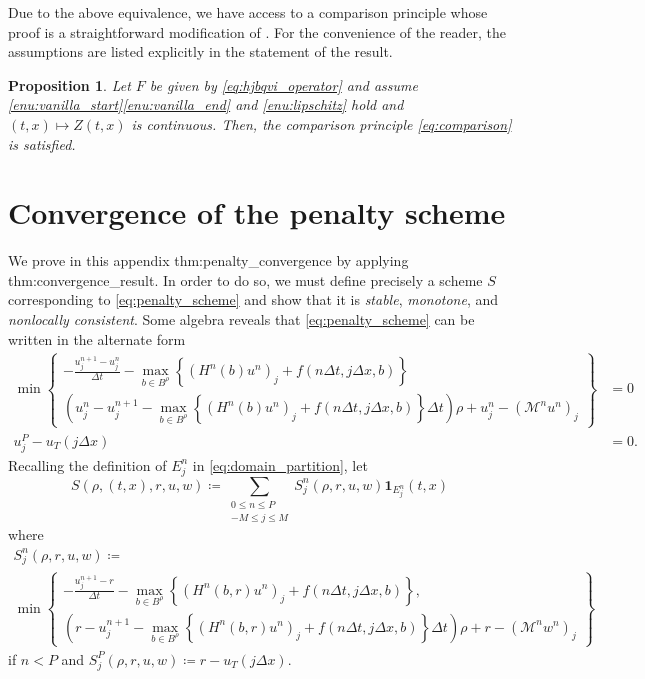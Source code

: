\documentclass[12pt]{article}
\newcounter{dummy}
\newtheorem{proposition}[dummy]{Proposition}
\begin{document}
Due to the above equivalence, we have access to a comparison principle
whose proof is a straightforward modification of \cite[Theorem 2.13]{azimzadeh2016value}.
For the convenience of the reader, the assumptions are listed explicitly
in the statement of the result.
\begin{proposition}
Let $F$ be given by \eqref{eq:hjbqvi_operator} and assume
\ref{enu:vanilla_start}\textendash \ref{enu:vanilla_end} and
\ref{enu:lipschitz} hold and $(t,x)\mapsto Z(t,x)$ is continuous.
Then, the comparison principle \eqref{eq:comparison} is satisfied.
\end{proposition}

\section{\label{app:penalty_convergence}Convergence of the penalty scheme}

We prove in this appendix {\prettyref}{thm:penalty_convergence} by
applying {\prettyref}{thm:convergence_result}. In order to do so, we
must define precisely a scheme $S$ corresponding to \eqref{eq:penalty_scheme}
and show that it is \emph{stable}, \emph{monotone}, and \emph{nonlocally
consistent}. Some algebra reveals that \eqref{eq:penalty_scheme}
can be written in the alternate form
\begin{align*}
\min\left\{ \begin{gathered}-\frac{u_{j}^{n+1}-u_{j}^{n}}{\Delta t}-\max_{b\in B^{\rho}}\left\{ (H^{n}(b)u^{n})_{j}+f(n\Delta t,j\Delta x,b)\right\} \\
(u_{j}^{n}{-}u_{j}^{n+1}-\max_{b\in B^{\rho}}\left\{ (H^{n}(b)u^{n})_{j}+f(n\Delta t,j\Delta x,b)\right\} \Delta t)\rho+u_{j}^{n}{-}(\mathcal{M}^{n}u^{n})_{j}
\end{gathered}
\right\}  & =0\\
u_{j}^{P}-u_{T}(j\Delta x) & =0.
\end{align*}
Recalling the definition of $E_{j}^{n}$ in \eqref{eq:domain_partition},
let
\begin{equation}
S(\rho,(t,x),r,u,w)\coloneqq\sum_{\substack{0{\leqslant} n{\leqslant} P\\
-M{\leqslant} j{\leqslant} M
}
}S_{j}^{n}(\rho,r,u,w)\mathbf{1}_{E_{j}^{n}}(t,x)\label{eq:penalty_formal}
\end{equation}
where
\begin{multline*}
S_{j}^{n}(\rho,r,u,w)\coloneqq\\
\min\left\{ \begin{gathered}-\frac{u_{j}^{n+1}-r}{\Delta t}-\max_{b\in B^{\rho}}\left\{ (H^{n}(b,r)u^{n})_{j}+f(n\Delta t,j\Delta x,b)\right\}, \\
(r-u_{j}^{n+1}-\max_{b\in B^{\rho}}\left\{ (H^{n}(b,r)u^{n})_{j}+f(n\Delta t,j\Delta x,b)\right\} \Delta t)\rho+r-(\mathcal{M}^{n}w^{n})_{j}
\end{gathered}
\right\} 
\end{multline*}
if $n<P$ and $S_{j}^{P}(\rho,r,u,w)\coloneqq r-u_{T}(j\Delta x)$.
\end{document}
